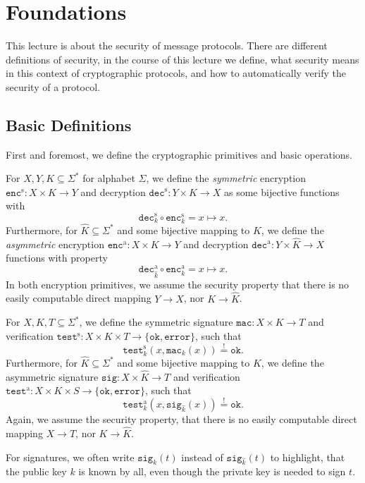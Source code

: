 \chapter{Foundations}
This lecture is about the security of message protocols.
There are different definitions of security, in the course of this lecture we define, what security means in this context of cryptographic protocols, and how to automatically verify the security of a protocol.

\section{Basic Definitions}
First and foremost, we define the cryptographic primitives and basic operations.

\newcommand{\encs}{\texttt{enc}^\text{s}}
\newcommand{\enca}{\texttt{enc}^\text{a}}
\newcommand{\decs}{\texttt{dec}^\text{s}}
\newcommand{\deca}{\texttt{dec}^\text{a}}
\begin{definition}
    For \(X,Y,K \subseteq \Sigma^*\) for alphabet \(\Sigma\), we define the \emph{symmetric} encryption \(\encs : X \times K \rightarrow Y\) and decryption \(\decs : Y \times K \rightarrow X\) as some bijective functions with
    \[\decs_k \circ \encs_k = x \mapsto x.\]
    Furthermore, for \(\hat K \subseteq \Sigma^*\) and some bijective mapping to \(K\), we define the \emph{asymmetric} encryption \(\enca : X \times K \rightarrow Y\) and decryption \(\deca : Y \times \hat K \rightarrow X\) functions with property
    \[\deca_{\hat{k}} \circ \enca_{k} = x \mapsto x.\]
    In both encryption primitives, we assume the security property that there is no easily computable direct mapping \(Y \rightarrow X\), nor \(K \rightarrow \hat K\).

\end{definition}

\newcommand{\mac}{\texttt{mac}}
\newcommand{\tests}{\texttt{test}^\text{s}}
\newcommand{\testa}{\texttt{test}^\text{a}}
\newcommand{\ok}{\texttt{ok}}
\newcommand{\err}{\texttt{error}}
\newcommand{\sig}{\texttt{sig}}
\begin{definition}
    For \(X,K,T \subseteq \Sigma^*\), we define the symmetric signature \(\mac : X \times K \rightarrow T\) and verification \(\tests : X \times K \times T \rightarrow \{\ok, \err\}\), such that
    \[\tests_k(x, \mac_k(x)) \overset{!}{=} \ok.\]
    Furthermore, for \(\hat K \subseteq \Sigma^*\) and some bijective mapping to \(K\), we define the asymmetric signature \(\sig : X \times \hat K \rightarrow T\) and verification \(\testa : X \times K \times S \rightarrow \{\ok, \err\}\), such that
    \[\testa_k(x, \sig_{\hat{k}}(x)) \overset{!}{=} \ok.\]
    Again, we assume the security property, that there is no easily computable direct mapping \(X \rightarrow T\), nor \(K \rightarrow \hat K\).

    For signatures, we often write \(\sig_k(t)\) instead of \(\sig_{\hat k}(t)\) to highlight, that the public key \(k\) is known by all, even though the private key is needed to sign \(t\).
\end{definition}

